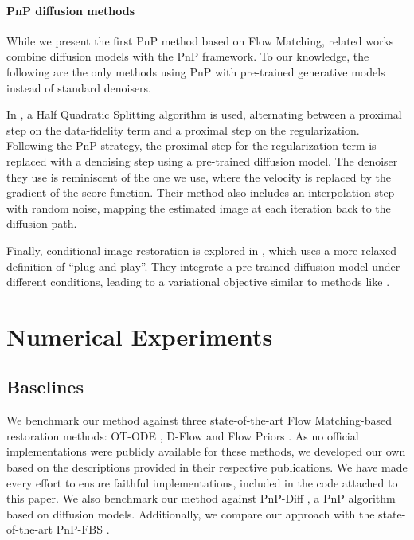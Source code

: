 \documentclass{article} %
\theoremstyle{definition}
\begin{document}
\paragraph{PnP diffusion methods}
While we present the first PnP method based on Flow Matching, related works combine diffusion models with the PnP framework. To our knowledge, the following are the only methods using PnP with pre-trained generative models instead of standard denoisers.

In \citet{zhu2023denoising}, a Half Quadratic Splitting algorithm is used, alternating between a proximal step on the data-fidelity term and a proximal step on the regularization. Following the PnP strategy, the proximal step for the regularization term is replaced with a denoising step using a pre-trained diffusion model. The denoiser they use is reminiscent of the one we use, where the velocity is replaced by the gradient of the score function. Their method also includes an interpolation step with random noise, mapping the estimated image at each iteration back to the diffusion path.

Finally, conditional image restoration is explored in \citep{graikos2022diffusion}, which uses a more relaxed definition of ``plug and play''. They integrate a pre-trained diffusion model under different conditions, leading to a variational objective similar to methods like \citet{mardani2024variational}.

\section{Numerical Experiments}

\subsection{Baselines}
We benchmark our method against three state-of-the-art Flow Matching-based restoration methods: OT-ODE \citep{pokle2024trainingfree}, D-Flow \citep{ben2024dflow} and Flow Priors \citep{zhang2024flow}.
 As no official implementations were publicly available for these methods, we developed our own based on the descriptions provided in their respective publications. We have made every effort to ensure faithful implementations, included in the code attached to this paper. We also benchmark our method against PnP-Diff \citep{zhu2023denoising}, a PnP algorithm based on diffusion models. Additionally, we compare our approach with the state-of-the-art PnP-FBS \citep{hurault2022gradient}.
\end{document}
